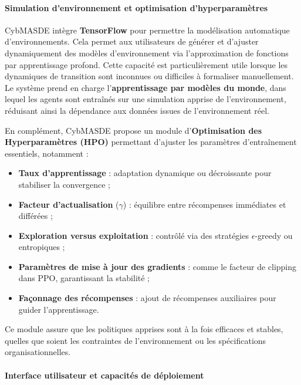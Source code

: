 \documentclass[pdflatex,sn-mathphys-num]{sn-jnl}%
\theoremstyle{thmstyleone}%
\theoremstyle{thmstyletwo}%
\theoremstyle{thmstylethree}%
\begin{document}
\paragraph{Simulation d'environnement et optimisation d'hyperparamètres}

CybMASDE intègre \textbf{TensorFlow} pour permettre la modélisation automatique d'environnements. Cela permet aux utilisateurs de générer et d'ajuster dynamiquement des modèles d'environnement via l'approximation de fonctions par apprentissage profond. Cette capacité est particulièrement utile lorsque les dynamiques de transition sont inconnues ou difficiles à formaliser manuellement. Le système prend en charge l'\textbf{apprentissage par modèles du monde}, dans lequel les agents sont entraînés sur une simulation apprise de l'environnement, réduisant ainsi la dépendance aux données issues de l'environnement réel.

En complément, CybMASDE propose un module d'\textbf{Optimisation des Hyperparamètres (HPO)} permettant d'ajuster les paramètres d'entraînement essentiels, notamment :

\begin{itemize}
    \item \textbf{Taux d'apprentissage} : adaptation dynamique ou décroissante pour stabiliser la convergence ;
    \item \textbf{Facteur d'actualisation} ($\gamma$) : équilibre entre récompenses immédiates et différées ;
    \item \textbf{Exploration versus exploitation} : contrôlé via des stratégies $\epsilon$-greedy ou entropiques ;
    \item \textbf{Paramètres de mise à jour des gradients} : comme le facteur de clipping dans PPO, garantissant la stabilité ;
    \item \textbf{Façonnage des récompenses} : ajout de récompenses auxiliaires pour guider l'apprentissage.
\end{itemize}

Ce module assure que les politiques apprises sont à la fois efficaces et stables, quelles que soient les contraintes de l'environnement ou les spécifications organisationnelles.

\paragraph{Interface utilisateur et capacités de déploiement}
\end{document}

